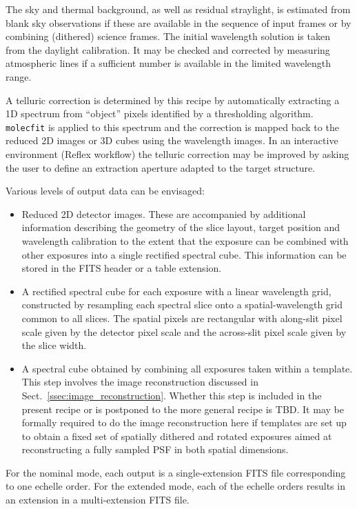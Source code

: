 The sky and thermal background, as well as residual straylight, is
estimated from blank sky observations if these are available in the
sequence of input frames or by combining (dithered) science
frames. The initial wavelength solution is taken from the daylight
calibration. It may be checked and corrected by measuring atmospheric
lines if a sufficient number is available in the limited wavelength
range.

A telluric correction is determined by this recipe by automatically
extracting a 1D spectrum from ``object'' pixels identified by a
thresholding algorithm. \lstinline{molecfit} is applied to this
spectrum and the correction is mapped back to the reduced 2D images or
3D cubes using the wavelength images. In an interactive environment
(Reflex workflow) the telluric correction may be improved by asking
the user to define an extraction aperture adapted to the target
structure.

Various levels of output data can be envisaged:
\begin{itemize}
\item Reduced 2D detector images. These are accompanied by additional
  information describing the geometry of the slice layout, target
  position and wavelength calibration to the extent that the exposure can be
  combined with other exposures into a single rectified spectral cube.
  This information can be stored in the FITS header or a table
  extension.
\item A rectified spectral cube for each exposure with a linear
  wavelength grid, constructed by resampling each spectral slice onto
  a spatial-wavelength grid common to all slices. The spatial pixels
  are rectangular with along-slit pixel scale given by the detector
  pixel scale and the across-slit pixel scale given by the slice
  width.
\item A spectral cube obtained by combining all exposures taken within
  a template. This step involves the image reconstruction discussed in
  Sect.~\ref{ssec:image_reconstruction}. Whether this step is included
  in the present recipe  or is postponed to
  the more general recipe  is TBD. It
  may be formally required to do the image reconstruction here if
  templates are set up to obtain a fixed set of spatially dithered and
  rotated exposures aimed at reconstructing a fully sampled PSF in
  both spatial dimensions.
\end{itemize}

For the nominal mode, each output is a single-extension FITS file
corresponding to one echelle order. For the extended mode, each of the
echelle orders results in an extension in a multi-extension FITS
file.

